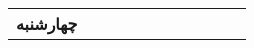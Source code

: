 \documentclass{article}
\begin{document}
\begin{sidewaystable}[h]
\begin{center}
\begin{tabular}{|c|c|c|c|c|c|c|c|c|c|c|}
								\multirow{5}{*}{\textbf{چهارشنبه}}
				& & & & & & & & & & \\
				\cline{2-11}
				& & & & & & & & & & \\
				\cline{2-11}				
				& & & & & & & & & & \\
				\cline{2-11}
				& & & & & & & & & & \\
				\cline{2-11}				
				& & & & & & & & & & \\
				\hline
				
			\end{tabular}
		\end{center}
	\end{sidewaystable}
\end{document}
